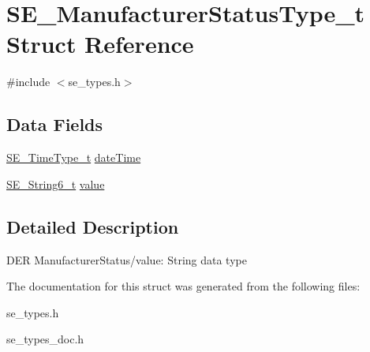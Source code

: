 \hypertarget{structSE__ManufacturerStatusType__t}{}\section{S\+E\+\_\+\+Manufacturer\+Status\+Type\+\_\+t Struct Reference}
\label{structSE__ManufacturerStatusType__t}


{\ttfamily \#include $<$se\+\_\+types.\+h$>$}

\subsection*{Data Fields}
\begin{DoxyCompactItemize}
\item 
\hyperlink{group__TimeType_ga6fba87a5b57829b4ff3f0e7638156682}{S\+E\+\_\+\+Time\+Type\+\_\+t} \hyperlink{group__ManufacturerStatusType_gad0313c40eccb3f4b5e5fb405eeb9d470}{date\+Time}
\item 
\hyperlink{group__String6_gaabaf8635c2aa9b276e2b92509ddfa136}{S\+E\+\_\+\+String6\+\_\+t} \hyperlink{group__ManufacturerStatusType_ga34c8afb6151ae57d70428b168d40e1ac}{value}
\end{DoxyCompactItemize}


\subsection{Detailed Description}
D\+ER Manufacturer\+Status/value\+: String data type 

The documentation for this struct was generated from the following files\+:\begin{DoxyCompactItemize}
\item 
se\+\_\+types.\+h\item 
se\+\_\+types\+\_\+doc.\+h\end{DoxyCompactItemize}
